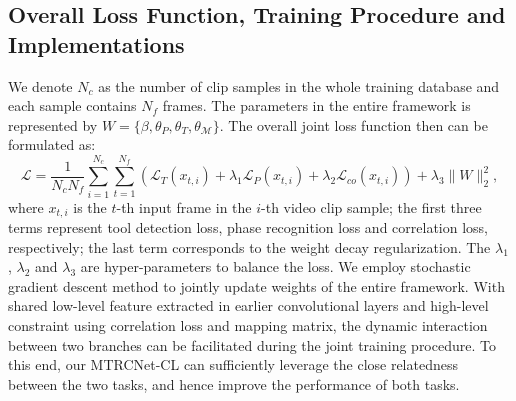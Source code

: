 \documentclass{elsarticle}
\begin{document}
\subsection{Overall Loss Function, Training Procedure and Implementations}
\label{imple}
We denote $N_c$ as the number of clip samples in the whole training database and each sample contains $N_f$ frames.
The parameters in the entire framework is represented by $W=\{\beta,\theta_P,\theta_T,\theta_\mathcal{M} \}$.
The overall joint loss function then can be formulated as:
\begin{equation}
	\label{eq:overall}
	\mathcal{L} = \frac{1}{N_c N_f} \sum\limits_{i=1}^{N_c} \sum\limits_{t=1}^{N_f} (\mathcal{L}_{T}(x_{t,i}) + \lambda_1\mathcal{L}_{P}(x_{t,i}) + \lambda_2\mathcal{L}_{co}(x_{t,i})  )  +\lambda_3\|W\|_2^2,
\end{equation}
where $x_{t,i}$ is the $t$-th input frame in the $i$-th video clip sample;
the first three terms represent tool detection loss, phase recognition loss and correlation loss, respectively;
the last term corresponds to the weight decay regularization.
The $\lambda_1$, $\lambda_2$ and $\lambda_3$ are hyper-parameters to balance the loss.
We employ stochastic gradient descent method to jointly update weights of the entire framework.
With shared low-level feature extracted in earlier convolutional layers and high-level constraint using correlation loss and mapping matrix,
the dynamic interaction between two branches can be facilitated during the joint training procedure.
To this end, our MTRCNet-CL can sufficiently leverage the close relatedness between the two tasks, and hence improve the performance of both tasks.
\end{document}
